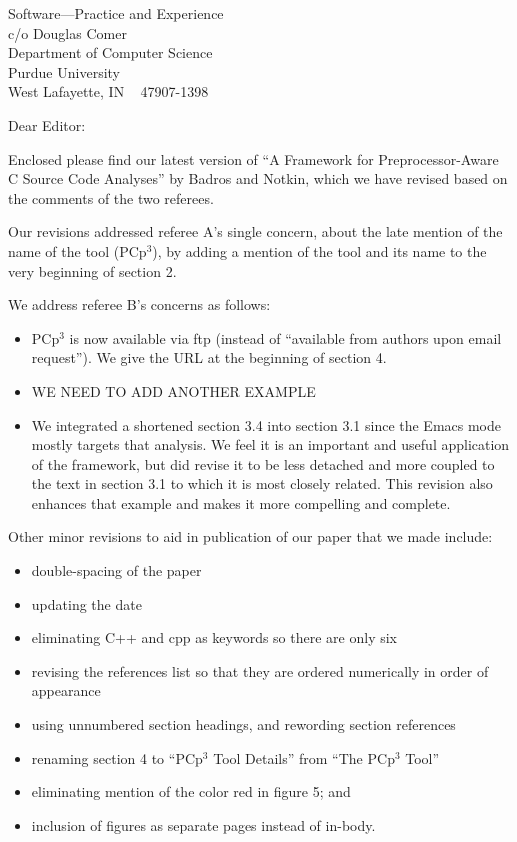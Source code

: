 \documentclass{letter}
\newcommand{\pcp}{\mbox{\textsf{PCp}$^3$}}
\begin{document}
\begin{letter}{
Software---Practice and Experience \\
c/o Douglas Comer \\
Department of Computer Science \\
Purdue University \\
West Lafayette, IN ~ 47907-1398}

\opening{Dear Editor:}

Enclosed please find our latest version of ``A Framework for
Preprocessor-Aware C Source Code Analyses'' by Badros and Notkin, which we
have revised based on the comments of the two referees.

Our revisions addressed referee A's single concern, about the late
mention of the name of the tool (\pcp{}), by adding a mention of the
tool and its name to the very beginning of section 2.

We address referee B's concerns as follows:

\begin{itemize}
\item \pcp{} is now available via ftp (instead of ``available from
      authors upon email request'').  We give the URL at the beginning
      of section 4.
\item WE NEED TO ADD ANOTHER EXAMPLE
\item We integrated a shortened section 3.4 into section 3.1 since the
      Emacs mode mostly targets that analysis.  We feel it is an
      important and useful application of the framework, but did revise
      it to be less detached and more coupled to the text in section 3.1 
      to which it is most closely related.  This revision also enhances that
      example and makes it more compelling and complete.
\end{itemize}

Other minor revisions to aid in publication of our paper that we made
include:

\begin{itemize}
\item double-spacing of the paper
\item updating the date
\item eliminating C++ and cpp as keywords so there are only six
\item revising the references list so that they are ordered numerically
      in order of appearance
\item using unnumbered section headings, and rewording section references
\item renaming section 4 to ``\pcp{} Tool Details'' from ``The \pcp{}
      Tool''
\item eliminating mention of the color red in figure 5; and
\item inclusion of figures as separate pages instead of in-body.
\end{itemize}


\end{letter}
\end{document}
